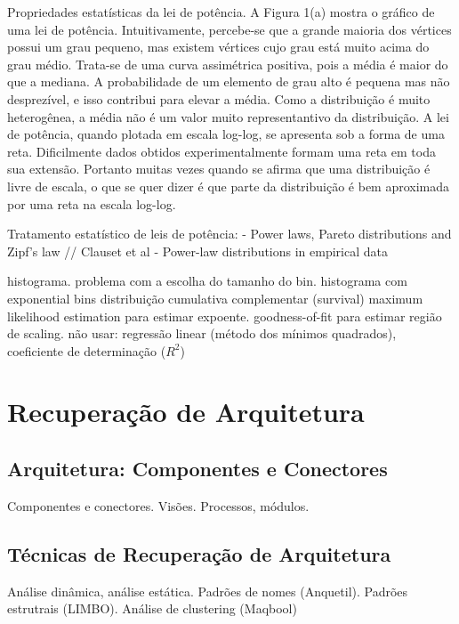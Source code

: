\documentclass{article}
\begin{document}
Propriedades estatísticas da lei de potência. A Figura 1(a) mostra o gráfico de uma lei de potência. Intuitivamente, percebe-se que a grande maioria dos vértices possui um grau pequeno, mas existem vértices cujo grau está muito acima do grau médio. Trata-se de uma curva assimétrica positiva, pois a média é maior do que a mediana. A probabilidade de um elemento de grau alto é pequena mas não desprezível, e isso contribui para elevar a média. Como a distribuição é muito heterogênea, a média não é um valor muito representantivo da distribuição. A lei de potência, quando plotada em escala log-log, se apresenta sob a forma de uma reta. Dificilmente dados obtidos experimentalmente formam uma reta em toda sua extensão. Portanto muitas vezes quando se afirma que uma distribuição é livre de escala, o que se quer dizer é que parte da distribuição é bem aproximada por uma reta na escala log-log.

Tratamento estatístico de leis de potência:  \cite{Newman2005} - Power laws, Pareto distributions and Zipf's law   //   Clauset et al - Power-law distributions in empirical data \cite{Clauset2007}

histograma. problema com a escolha do tamanho do bin. histograma com exponential bins
distribuição cumulativa complementar (survival)
maximum likelihood estimation para estimar expoente.
goodness-of-fit para estimar região de scaling.
não usar: regressão linear (método dos mínimos quadrados), coeficiente de determinação ($R^2$)



\section{Recuperação de Arquitetura}

\subsection{Arquitetura: Componentes e Conectores}

Componentes e conectores.
Visões. Processos, módulos.

\subsection{Técnicas de Recuperação de Arquitetura}


Análise dinâmica, análise estática. Padrões de nomes (Anquetil). Padrões estrutrais (LIMBO). Análise de clustering (Maqbool)
\end{document}
